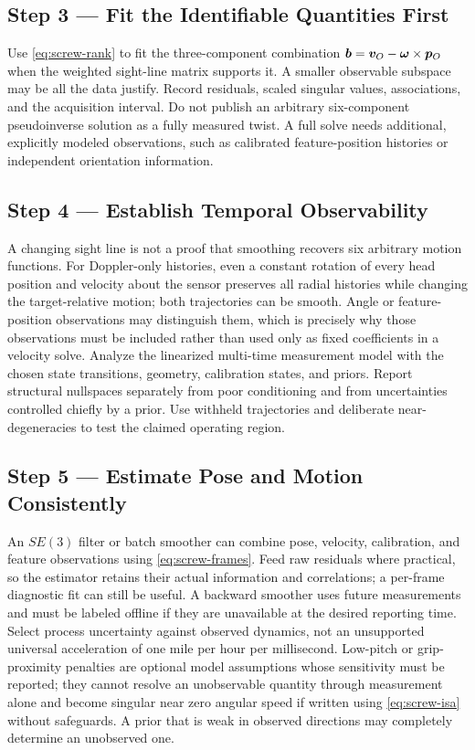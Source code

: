 \subsection*{Step 3 --- Fit the Identifiable Quantities First}

Use \cref{eq:screw-rank} to fit the three-component combination $\bm{b}=\bm{v}_O-\bm{\omega}\times\bm{p}_O$ when the weighted sight-line matrix supports it.
A smaller observable subspace may be all the data justify.
Record residuals, scaled singular values, associations, and the acquisition interval.
Do not publish an arbitrary six-component pseudoinverse solution as a fully measured twist.
A full solve needs additional, explicitly modeled observations, such as calibrated feature-position histories or independent orientation information.

\subsection*{Step 4 --- Establish Temporal Observability}

A changing sight line is not a proof that smoothing recovers six arbitrary motion functions.
For Doppler-only histories, even a constant rotation of every head position and velocity about the sensor preserves all radial histories while changing the target-relative motion; both trajectories can be smooth.
Angle or feature-position observations may distinguish them, which is precisely why those observations must be included rather than used only as fixed coefficients in a velocity solve.
Analyze the linearized multi-time measurement model with the chosen state transitions, geometry, calibration states, and priors.
Report structural nullspaces separately from poor conditioning and from uncertainties controlled chiefly by a prior.
Use withheld trajectories and deliberate near-degeneracies to test the claimed operating region.

\subsection*{Step 5 --- Estimate Pose and Motion Consistently}

An $SE(3)$ filter or batch smoother can combine pose, velocity, calibration, and feature observations using \cref{eq:screw-frames}.
Feed raw residuals where practical, so the estimator retains their actual information and correlations; a per-frame diagnostic fit can still be useful.
A backward smoother uses future measurements and must be labeled offline if they are unavailable at the desired reporting time.
Select process uncertainty against observed dynamics, not an unsupported universal acceleration of one mile per hour per millisecond.
Low-pitch or grip-proximity penalties are optional model assumptions whose sensitivity must be reported; they cannot resolve an unobservable quantity through measurement alone and become singular near zero angular speed if written using \cref{eq:screw-isa} without safeguards.
A prior that is weak in observed directions may completely determine an unobserved one.

